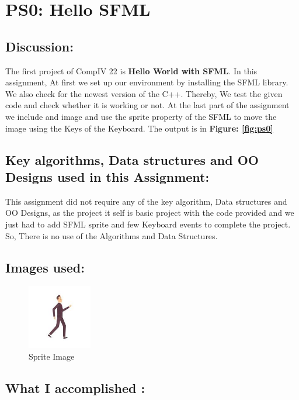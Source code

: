 \section{PS0: Hello SFML}\label{sec:ps0}
\graphicspath{{ps0}}
\subsection{Discussion:}\label{sec:ps0:disc}
 
       
 
    The first project of CompIV 22 is \textbf{Hello World with SFML}. In this assignment, At first we set up our environment by installing the SFML library. We also check for the newest version of the C++. Thereby, We test the given code and check whether it is working or not. At the last part of the assignment we include and image and use the sprite property of the SFML to move the image using the Keys of the Keyboard. The output is in\textbf{ Figure: \ref{fig:ps0}} 

\subsection{Key algorithms, Data structures and OO Designs used in this Assignment:}\label{sec:ps0:kdo}

    This assignment did not require any of the key algorithm, Data structures and OO Designs, as the project it self is basic project with the code provided and we just had to add SFML sprite and few Keyboard events to complete the project.
    So, There is no use of the Algorithms and Data Structures.


\subsection{Images used:}\label{sec:ps0:img}
\begin{figure}[h]
    \centering
    \includegraphics[width=0.25\textwidth]{ps0/sprite.png}
    \caption{Sprite Image}
    \label{fig:mesh1}
\end{figure}

\subsection{What I accomplished :}\label{sec:ps0:accomplish}

